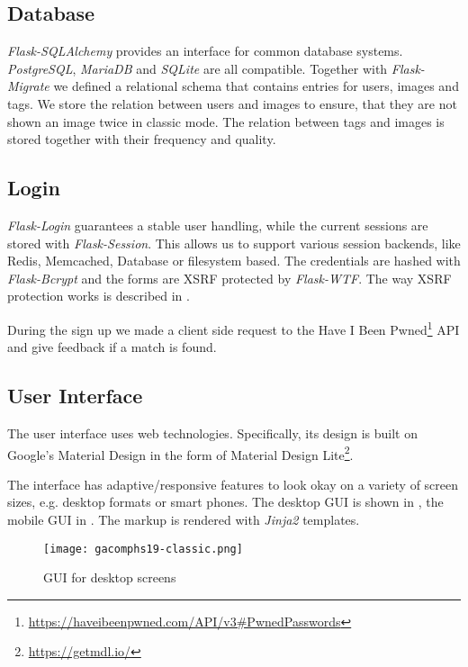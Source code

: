 \subsection{Database}
\label{gacomphs19:sec:implementation:database}
\textit{Flask-SQLAlchemy} provides an interface for common database systems. \textit{PostgreSQL}, \textit{MariaDB} and \textit{SQLite} are all compatible.
Together with \textit{Flask-Migrate} we defined a relational schema that contains entries for users, images and tags. We store the relation between users and images to ensure, that they are not shown an image twice in classic mode. The relation between tags and images is stored together with their frequency and quality.

\subsection{Login}
\label{gacomphs19:sec:implementation:login}
\textit{Flask-Login} guarantees a stable user handling, while the current sessions are stored with \textit{Flask-Session}. This allows us to support various session backends, like Redis, Memcached, Database or filesystem based. The credentials are hashed with \textit{Flask-Bcrypt} and the forms are XSRF protected by \textit{Flask-WTF}. The way XSRF protection works is described in \cite{4198791}.

During the sign up we made a client side request to the Have I Been Pwned\footnote{\url{https://haveibeenpwned.com/API/v3\#PwnedPasswords}} API and give feedback if a match is found.

\subsection{User Interface}
\label{gacomphs19:sec:implementation:UI}

The user interface uses web technologies. Specifically, its design is built on Google's Material Design in the form of Material Design Lite\footnote{\url{https://getmdl.io/}}.

The interface has adaptive/responsive features to look okay on a variety of screen sizes, e.g. desktop formats or smart phones. The desktop GUI is shown in , the mobile GUI in .
The markup is rendered with \textit{Jinja2} templates.



\begin{figure}[!]
\centering
\texttt{[image: gacomphs19-classic.png]}
\caption{GUI for desktop screens}
\label{gacomphs19:fig:guiclassicdesktop}
\end{figure}


